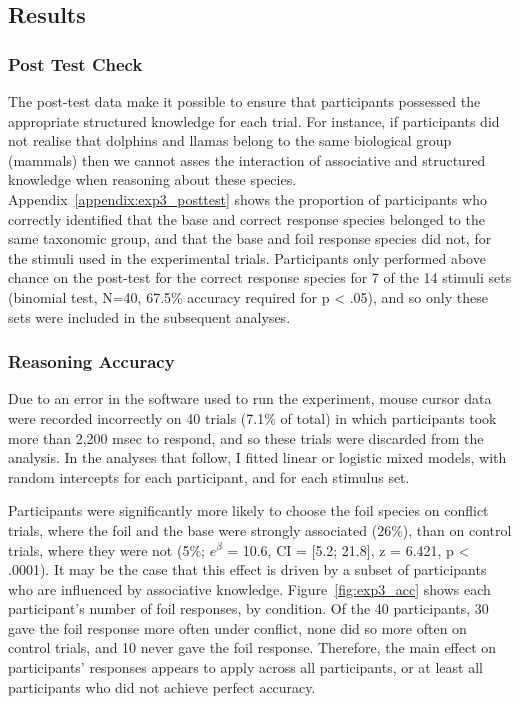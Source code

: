 
\subsection{Results}

\subsubsection{Post Test Check}

The post-test data make it possible to ensure that participants
possessed the appropriate structured knowledge for each trial.
For instance, if participants did not realise that
dolphins and llamas belong to the same biological group (mammals)
then we cannot asses the interaction of
associative and structured knowledge when reasoning about these species.
Appendix~\ref{appendix:exp3_posttest} shows the proportion of participants
who correctly identified that the base and correct response species
belonged to the same taxonomic group,
and that the base and foil response species did not,
for the stimuli used in the experimental trials.
Participants only performed above chance on the post-test
for the correct response species for 7 of the 14 stimuli sets
(binomial test, N=40, 67.5\% accuracy required for p < .05),
and so only these sets were included in the subsequent analyses.

  
\subsubsection{Reasoning Accuracy}

Due to an error in the software used to run the experiment,
mouse cursor data were recorded incorrectly on 40 trials (7.1\% of total)
in which participants took more than 2,200 msec to respond,
and so these trials were discarded from the analysis.
In the analyses that follow, I fitted linear or logistic mixed models, 
with random intercepts for each participant, and for each stimulus set.

Participants were significantly more likely to
choose the foil species on conflict trials,
where the foil and the base were strongly associated (26\%),
than on control trials, where they were not (5\%;
$e^{\beta}$ = 10.6, CI = [5.2; 21.8],
z = 6.421, p < .0001).
It may be the case that this effect is driven by
a subset of participants who are influenced by associative knowledge.
Figure~\ref{fig:exp3_acc} shows each participant's number of foil responses, by condition.
Of the 40 participants, 30 gave the foil response more often under conflict,
none did so more often on control trials,
and 10 never gave the foil response.
Therefore, the main effect on participants' responses
appears to apply across all participants,
or at least all participants who did not achieve perfect accuracy.

